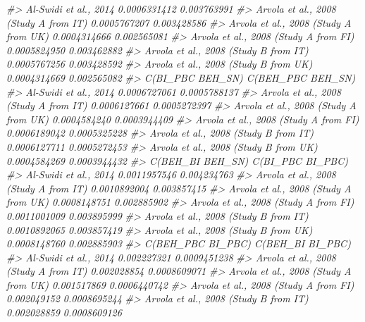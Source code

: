 \documentclass[
]{book}
\newenvironment{Shaded}{\begin{snugshade}}{\end{snugshade}}
\newcommand{\CommentTok}[1]{\textcolor[rgb]{0.56,0.35,0.01}{\textit{#1}}}
\begin{document}
\begin{Shaded}
\begin{Highlighting}[]
\CommentTok{\#\textgreater{} Al{-}Swidi et al., 2014                    0.0006331412      0.003763991}
\CommentTok{\#\textgreater{} Arvola et al., 2008 (Study A from IT)    0.0005767207      0.003428586}
\CommentTok{\#\textgreater{} Arvola et al., 2008 (Study A from UK)    0.0004314666      0.002565081}
\CommentTok{\#\textgreater{} Arvola et al., 2008 (Study A from FI)    0.0005824950      0.003462882}
\CommentTok{\#\textgreater{} Arvola et al., 2008 (Study B from IT)    0.0005767256      0.003428592}
\CommentTok{\#\textgreater{} Arvola et al., 2008 (Study B from UK)    0.0004314669      0.002565082}
\CommentTok{\#\textgreater{}                                       C(BI\_PBC BEH\_SN) C(BEH\_PBC BEH\_SN)}
\CommentTok{\#\textgreater{} Al{-}Swidi et al., 2014                     0.0006727061      0.0005788137}
\CommentTok{\#\textgreater{} Arvola et al., 2008 (Study A from IT)     0.0006127661      0.0005272397}
\CommentTok{\#\textgreater{} Arvola et al., 2008 (Study A from UK)     0.0004584240      0.0003944409}
\CommentTok{\#\textgreater{} Arvola et al., 2008 (Study A from FI)     0.0006189042      0.0005325228}
\CommentTok{\#\textgreater{} Arvola et al., 2008 (Study B from IT)     0.0006127711      0.0005272453}
\CommentTok{\#\textgreater{} Arvola et al., 2008 (Study B from UK)     0.0004584269      0.0003944432}
\CommentTok{\#\textgreater{}                                       C(BEH\_BI BEH\_SN) C(BI\_PBC BI\_PBC)}
\CommentTok{\#\textgreater{} Al{-}Swidi et al., 2014                     0.0011957546      0.004234763}
\CommentTok{\#\textgreater{} Arvola et al., 2008 (Study A from IT)     0.0010892004      0.003857415}
\CommentTok{\#\textgreater{} Arvola et al., 2008 (Study A from UK)     0.0008148751      0.002885902}
\CommentTok{\#\textgreater{} Arvola et al., 2008 (Study A from FI)     0.0011001009      0.003895999}
\CommentTok{\#\textgreater{} Arvola et al., 2008 (Study B from IT)     0.0010892065      0.003857419}
\CommentTok{\#\textgreater{} Arvola et al., 2008 (Study B from UK)     0.0008148760      0.002885903}
\CommentTok{\#\textgreater{}                                       C(BEH\_PBC BI\_PBC) C(BEH\_BI BI\_PBC)}
\CommentTok{\#\textgreater{} Al{-}Swidi et al., 2014                       0.002227321     0.0009451238}
\CommentTok{\#\textgreater{} Arvola et al., 2008 (Study A from IT)       0.002028854     0.0008609071}
\CommentTok{\#\textgreater{} Arvola et al., 2008 (Study A from UK)       0.001517869     0.0006440742}
\CommentTok{\#\textgreater{} Arvola et al., 2008 (Study A from FI)       0.002049152     0.0008695244}
\CommentTok{\#\textgreater{} Arvola et al., 2008 (Study B from IT)       0.002028859     0.0008609126}

\end{Highlighting}
\end{Shaded}
\end{document}
